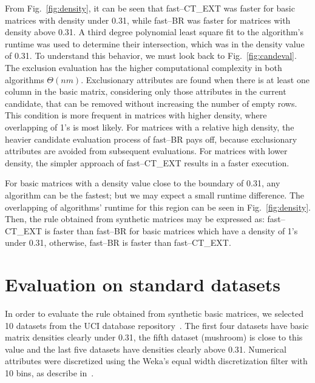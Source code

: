 \documentclass[citenumber]{llncs}
\begin{document}
	From Fig.~\ref{fig:density}, it can be seen that fast--CT\_EXT was faster for basic matrices with density under 0.31, while fast--BR was faster for matrices with density above 0.31. A third degree polynomial least square fit to the algorithm's runtime was used to determine their intersection, which was in the density value of 0.31. To understand this behavior, we must look back to Fig.~\ref{fig:candeval}. The exclusion evaluation has the higher computational complexity in both algorithms $\Theta (nm)$. Exclusionary attributes are found when there is at least one column in the basic matrix, considering only those attributes in the current candidate, that can be removed without increasing the number of empty rows. This condition is more frequent in matrices with higher density, where overlapping of 1's is most likely. For matrices with a relative high density, the heavier candidate evaluation process of fast--BR pays off, because exclusionary attributes are avoided from subsequent evaluations. For matrices with lower density, the simpler approach of fast--CT\_EXT results in a faster execution.
	
	For basic matrices with a density value close to the boundary of 0.31, any algorithm can be the fastest; but we may expect a small runtime difference. The overlapping of algorithms' runtime for this region can be seen in  Fig.~\ref{fig:density}. Then, the rule obtained from synthetic matrices may be expressed as: fast--CT\_EXT is faster than fast--BR for basic matrices which have a density of 1's under 0.31, otherwise, fast--BR is faster than fast--CT\_EXT.
%
\section{Evaluation on standard datasets} \label{evaluation}
	In order to evaluate the rule obtained from synthetic basic matrices, we selected 10 datasets from the UCI database repository~\cite{Bache13}. The first four datasets have basic matrix densities clearly under 0.31, the fifth dataset  (mushroom) is close to this value and the last five datasets have densities clearly above 0.31. Numerical attributes were discretized using the Weka's equal width discretization filter with 10 bins, as describe in~\cite{Flores2010}.
	
\end{document}
